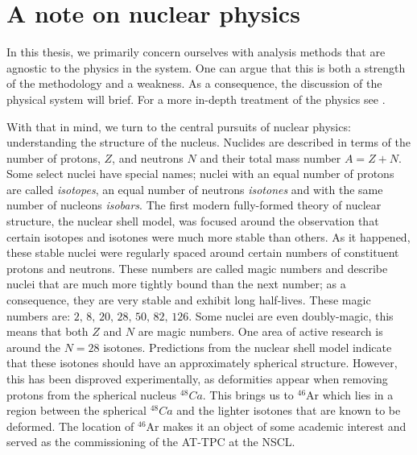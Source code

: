 

\section{A note on nuclear physics}

In this thesis, we primarily concern ourselves with analysis methods that are agnostic to the physics in the system. One can argue that this is both a strength of the methodology and a weakness. As a consequence, the discussion of the physical system will brief. For a more in-depth treatment of the physics see \cite{Bradt2017}. 

With that in mind, we turn to the central pursuits of nuclear physics: understanding the structure of the nucleus. Nuclides are described in terms of the number of protons, $Z$, and neutrons $N$ and their total mass number $A = Z +N$. Some select nuclei have special names; nuclei with an equal number of protons are called \textit{isotopes}, an equal number of neutrons \textit{isotones} and with the same number of nucleons \textit{isobars}. The first modern fully-formed theory of nuclear structure, the nuclear shell model, was focused around the observation that certain isotopes and isotones were much more stable than others. As it happened, these stable nuclei were regularly spaced around certain numbers of constituent protons and neutrons. These numbers are called magic numbers and describe nuclei that are much more tightly bound than the next number; as a consequence, they are very stable and exhibit long half-lives. These magic numbers are: $2 ,\, 8 ,\, 20 ,\, 28 ,\, 50 ,\, 82 ,\, 126$. Some nuclei are even doubly-magic, this means that both $Z$ and $N$ are magic numbers. One area of active research is around the $N=28$ isotones. Predictions from the nuclear shell model indicate that these isotones should have an approximately spherical structure. However, this has been disproved experimentally, as deformities appear when removing protons from the spherical nucleus ${}^{48}Ca$. This brings us to ${}^{46}$Ar which lies in a region between the spherical ${}^{48}Ca$ and the lighter isotones that are known to be deformed. The location of ${}^{46}$Ar makes it an object of some academic interest and served as the commissioning of the AT-TPC at the NSCL. 


